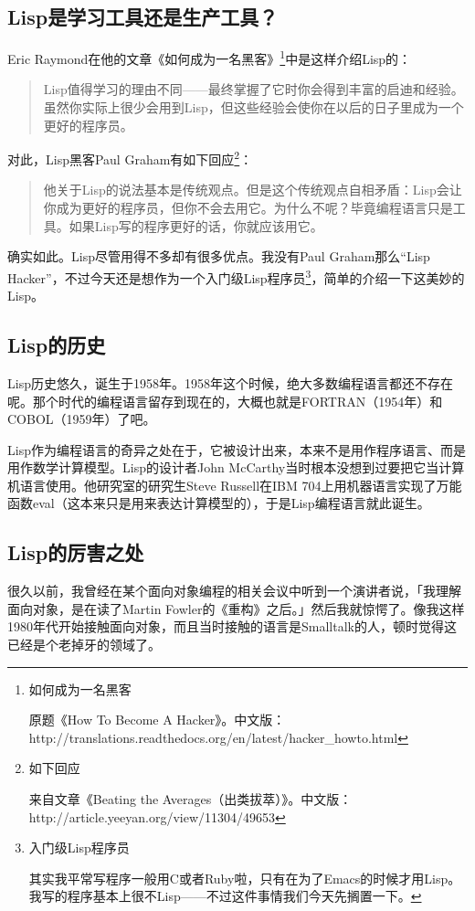 \documentclass[a4paper,12pt]{article}
\begin{document}
\subsection{Lisp是学习工具还是生产工具？}

Eric Raymond在他的文章《如何成为一名黑客》\footnote{如何成为一名黑客

  原题《How To Become A Hacker》。中文版：http://translations.readthedocs.org/en/latest/hacker\_howto.html}中是这样介绍Lisp的：
\begin{quote}
  Lisp值得学习的理由不同——最终掌握了它时你会得到丰富的启迪和经验。虽然你实际上很少会用到Lisp，但这些经验会使你在以后的日子里成为一个更好的程序员。
\end{quote}
对此，Lisp黑客Paul Graham有如下回应\footnote{如下回应

  来自文章《Beating the Averages（出类拔萃）》。中文版：http://article.yeeyan.org/view/11304/49653}：
\begin{quote}
  他关于Lisp的说法基本是传统观点。但是这个传统观点自相矛盾：Lisp会让你成为更好的程序员，但你不会去用它。为什么不呢？毕竟编程语言只是工具。如果Lisp写的程序更好的话，你就应该用它。
\end{quote}
确实如此。Lisp尽管用得不多却有很多优点。我没有Paul Graham那么“Lisp Hacker”，不过今天还是想作为一个入门级Lisp程序员\footnote{入门级Lisp程序员

其实我平常写程序一般用C或者Ruby啦，只有在为了Emacs的时候才用Lisp。我写的程序基本上很不Lisp——不过这件事情我们今天先搁置一下。}，简单的介绍一下这美妙的Lisp。

\subsection{Lisp的历史}
Lisp历史悠久，诞生于1958年。1958年这个时候，绝大多数编程语言都还不存在呢。那个时代的编程语言留存到现在的，大概也就是FORTRAN（1954年）和COBOL（1959年）了吧。

Lisp作为编程语言的奇异之处在于，它被设计出来，本来不是用作程序语言、而是用作数学计算模型。Lisp的设计者John McCarthy当时根本没想到过要把它当计算机语言使用。他研究室的研究生Steve Russell在IBM 704上用机器语言实现了万能函数eval（这本来只是用来表达计算模型的），于是Lisp编程语言就此诞生。

\subsection{Lisp的厉害之处}

很久以前，我曾经在某个面向对象编程的相关会议中听到一个演讲者说，「我理解面向对象，是在读了Martin Fowler的《重构》之后。」然后我就惊愕了。像我这样1980年代开始接触面向对象，而且当时接触的语言是Smalltalk的人，顿时觉得这已经是个老掉牙的领域了。
\end{document}
